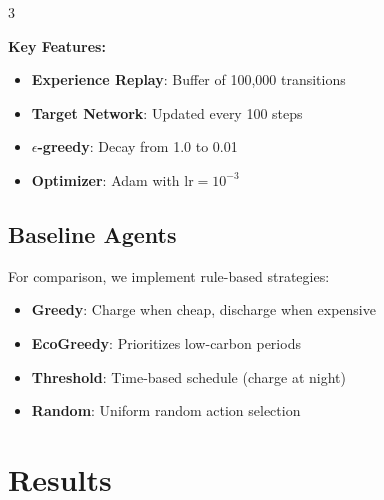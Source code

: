 \documentclass[a0,portrait]{a0poster}
\begin{document}
\begin{multicols}{3}
\begin{tcolorbox}[colback=uzhblau20, boxrule=0pt]
\begin{center}
\end{center}
\end{tcolorbox}

\vspace{0.3cm}
\textbf{Key Features:}
\begin{itemize}
    \item \textbf{Experience Replay}: Buffer of 100,000 transitions
    \item \textbf{Target Network}: Updated every 100 steps
    \item \textbf{$\epsilon$-greedy}: Decay from 1.0 to 0.01
    \item \textbf{Optimizer}: Adam with $\text{lr} = 10^{-3}$
\end{itemize}

\vspace{0.5cm}

\subsection*{Baseline Agents}
For comparison, we implement rule-based strategies:

\begin{itemize}
    \item \textbf{Greedy}: Charge when cheap, discharge when expensive
    \item \textbf{EcoGreedy}: Prioritizes low-carbon periods
    \item \textbf{Threshold}: Time-based schedule (charge at night)
    \item \textbf{Random}: Uniform random action selection
\end{itemize}

\vfill\null
\columnbreak


\section{Results}


\end{multicols}
\end{document}
